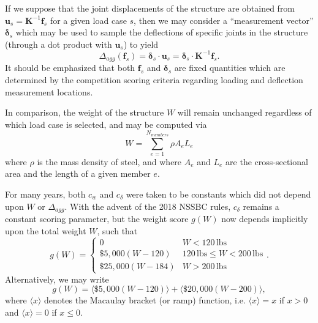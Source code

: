 \documentclass[12pt,a4paper,article]{memoir} %
\begin{document}
If we suppose that the joint displacements of the structure are obtained from $\mathbf{u}_s = \mathbf{K}^{-1} \mathbf{f}_s$ for a given load case $s$, then we may consider a ``measurement vector'' $\boldsymbol{\delta}_s$ which may be used to sample the deflections of specific joints in the structure (through a dot product with $\mathbf{u}_s$) to yield
\begin{equation}
	\Delta_{agg} (\mathbf{f}_s) = \boldsymbol{\delta}_s \cdot \mathbf{u}_s = \boldsymbol{\delta}_s \cdot \mathbf{K}^{-1} \mathbf{f}_s.
\end{equation}
It should be emphasized that both $\mathbf{f}_s$ and $\boldsymbol{\delta}_s$ are fixed quantities which are determined by the competition scoring criteria regarding loading and deflection measurement locations.

In comparison, the weight of the structure $W$ will remain unchanged regardless of which load case is selected, and may be computed via
\begin{equation}
	W = \sum_{e = 1}^{N_{members}} \rho A_e L_e
\end{equation}
where $\rho$ is the mass density of steel, and where $A_e$ and $L_e$ are the cross-sectional area and the length of a given member $e$.

For many years, both $c_w$ and $c_\delta$ were taken to be constants which did not depend upon $W$ or $\Delta_{agg}$. With the advent of the 2018 NSSBC rules, $c_\delta$ remains a constant scoring parameter, but the weight score $g(W)$ now depends implicitly upon the total weight $W$, such that
\setlength\arraycolsep{5pt}
\begin{equation}
	g(W) = \left\{ \begin{array}{cc} 0 & W < 120 \, \text{lbs} \\ \text{\$}5,000 (W - 120) & 120 \, \text{lbs} \leq W < 200 \, \text{lbs} \\ \text{\$}25,000 (W - 184) & W > 200 \, \text{lbs} \end{array} \right. .
\end{equation}
Alternatively, we may write
\begin{equation}
	g(W) = \langle \text{\$}5,000 (W - 120) \rangle + \langle \text{\$}20,000 (W - 200) \rangle,
\end{equation}
where $\langle x \rangle$ denotes the Macaulay bracket (or ramp) function, i.e. $\langle x \rangle = x$ if $x > 0$ and $\langle x \rangle = 0$ if $x \leq 0$.
\end{document}
